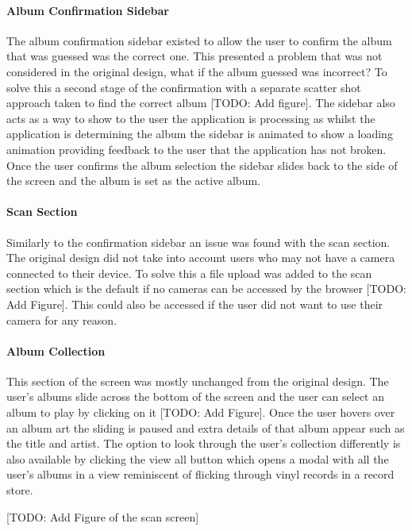 \paragraph{Album Confirmation Sidebar}
The album confirmation sidebar existed to allow the user to confirm the album that was guessed was the correct one. This presented a problem that was not considered in the original design, what if the album guessed was incorrect? To solve this a second stage of the confirmation with a separate scatter shot approach taken to find the correct album [TODO: Add figure]. The sidebar also acts as a way to show to the user the application is processing as whilst the application is determining the album the sidebar is animated to show a loading animation providing feedback to the user that the application has not broken. Once the user confirms the album selection the sidebar slides back to the side of the screen and the album is set as the active album.
\paragraph{Scan Section}
Similarly to the confirmation sidebar an issue was found with the scan section. The original design did not take into account users who may not have a camera connected to their device. To solve this a file upload was added to the scan section which is the default if no cameras can be accessed by the browser [TODO: Add Figure]. This could also be accessed if the user did not want to use their camera for any reason.
\paragraph{Album Collection}
This section of the screen was mostly unchanged from the original design. The user's albums slide across the bottom of the screen and the user can select an album to play by clicking on it [TODO: Add Figure]. Once the user hovers over an album art the sliding is paused and extra details of that album appear such as the title and artist. The option to look through the user's collection differently is also available by clicking the view all button which opens a modal with all the user's albums in a view reminiscent of flicking through vinyl records in a record store.

[TODO: Add Figure of the scan screen]

